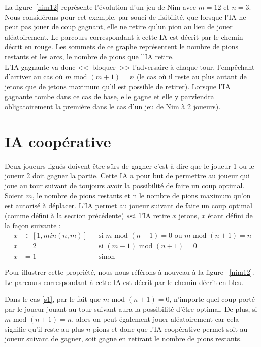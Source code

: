 \documentclass[10pt,a4paper]{article}
\newcommand{\ssi}{\textit{ssi. }}
\renewcommand{\mod}{\text{ mod }}
\begin{document}
La figure~\ref{nim12} représente l'évolution d'un jeu de Nim avec $m=12$ et
$n=3$. Nous considérons pour cet exemple, par souci de lisibilité, que lorsque
l'IA ne peut pas jouer de coup gagnant, elle ne retire qu'un pion au lieu de
jouer aléatoirement. Le parcours correspondant à cette IA est décrit par le
chemin décrit en {\color{red} rouge}. Les sommets de ce graphe représentent le
nombre de pions restants et les arcs, le nombre de pions que l'IA retire. \\
L'IA gagnante va donc <<~bloquer~>> l'adversaire à chaque tour, l'empêchant
d'arriver au cas où $m \mod (m+1) = n$ (le cas où il reste au plus autant de
jetons que de jetons maximum qu'il est possible de retirer). Lorsque l'IA
gagnante tombe dans ce cas de base, elle gagne et elle y parviendra
obligatoirement la première dans le cas d'un jeu de Nim à 2 joueurs).

\section{IA coopérative}
Deux joueurs ligués doivent être sûrs de gagner c'est-à-dire que le joueur 1 ou
le joueur 2 doit gagner la partie. Cette IA a pour but de permettre au joueur
qui joue au tour suivant de toujours avoir la possibilité de faire un coup
optimal. Soient $m$, le nombre de pions restants et n le nombre de pions maximum
qu'on est autorisé à déplacer. L'IA permet au joueur suivant de faire un coup
optimal (comme défini à la section précédente) \ssi l'IA retire $x$
jetons, $x$ étant défini de la façon suivante :
\begin{align}
	x &\in [1, min(n, m)] &&
	\text{si } m \mod (n+1) = 0 \text{ ou } m \mod (n+1) = n \label{s1} \\
	x &= 2 && \text{si } (m-1) \mod (n+1) = 0 \label{s2} \\
	x &= 1 && \text{sinon} \label{s3}
\end{align}

Pour illustrer cette propriété, nous nous référons à nouveau à la figure
~\ref{nim12}. Le parcours correspondant à cette IA est décrit par le chemin
décrit en {\color{blue} bleu}.

Dans le cas \eqref{s1}, par le fait que
$m \mod (n+1)=0$, n'importe quel coup porté par le joueur jouant au tour
suivant aura la possibilité d'être optimal. De plus, si $m \mod (n+1) = n$, alors
on peut également jouer aléatoirement car cela signifie qu'il reste au plus $n$
pions et donc que l'IA coopérative permet soit au joueur suivant de gagner, soit
gagne en retirant le nombre de pions restants.
\end{document}
